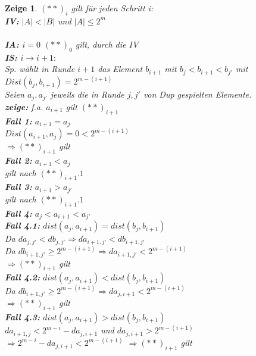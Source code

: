 \documentclass[12pt]{article}
\newtheorem{zeige}{Zeige}
\begin{document}
\begin{zeige}
  $(**)_i$ gilt für jeden Schritt i: \\

  \textbf{IV:} $|A| < |B|$ und $|A| \leq 2^m$ \\
  \\
  \textbf{IA: $i=0$} $(**)_0$ gilt, durch die IV \\
  \textbf{IS: $i\rightarrow i+1:$} \\
  Sp. wählt in Runde $i+1$ das Element $b_{i+1}$ mit $b_j<b_{i+1}<b_{j'}$ mit $Dist(b_j,b_{i+1})=2^{m-(i+1)}$ \\
  Seien $a_j,a_{j'}$ jeweils die in Runde $j,j'$ von Dup gespielten Elemente. \\
  \textbf{zeige: } f.a. $a_{i+1}$ gilt $(**)_{i+1}$ \\
  \textbf{ Fall 1: } $a_{i+1} = a_j$ \\
    $Dist(a_{i+1},a_j) = 0 < 2^{m-(i+1)}$ \\
    $\Rightarrow (**)_{i+1}$ gilt \\
  \textbf{ Fall 2: } $a_{i+1} < a_j$ \\
  gilt nach $(**)_{i+1}.1$ \\
  \textbf{ Fall 3: } $a_{i+1} > a_{j'}$ \\ 
  gilt nach $(**)_{i+1}.1$ \\
  \textbf{ Fall 4: } $a_{j} < a_{i+1} < a_{j'}$ \\
  \textbf{ Fall 4.1: } $dist(a_j,a_{i+1}) = dist(b_j,b_{i+1})$\\
  Da $da_{j,j'} < db_{j,j'} \Rightarrow da_{i+1,j'}<db_{i+1,j'}$\\
  Da $db_{i+1,j'}\geq 2^{m-(i+1)} \Rightarrow da_{i+1,j'}<2^{m-(i+1)}$ \\
  $\Rightarrow (**)_{i+1}$ gilt \\
  \textbf{ Fall 4.2: } $dist(a_j,a_{i+1}) < dist(b_j,b_{i+1})$\\
  Da $db_{i+1,j'} \geq 2^{m-(i+1)} \Rightarrow da_{j,i+1}<2^{m-(i+1)}$\\
  $\Rightarrow (**)_{i+1}$ gilt \\
  \textbf{ Fall 4.3: } $dist(a_j,a_{i+1}) > dist(b_j,b_{i+1})$ \\
  $da_{i+1,j} < 2^{m-i} - da_{j,i+1}$ und $da_{j,i+1} > 2^{m-(i+1)}$ \\
  $\Rightarrow 2^{m-i} - da_{j,i+1} < 2^{m-(i+1)}$
  $\Rightarrow (**)_{i+1}$ gilt \\

  
  
  
  

\end{zeige}
\end{document}

